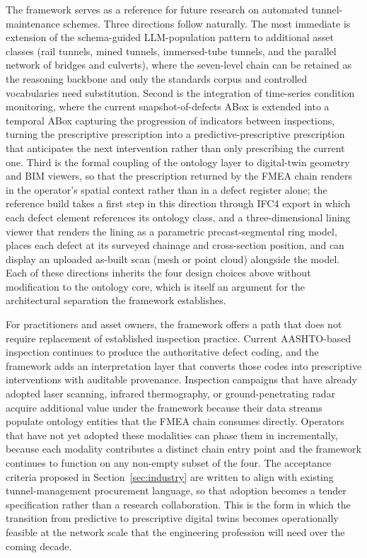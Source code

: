 \documentclass[11pt,a4paper]{article}
\begin{document}
The framework serves as a reference for future research on automated tunnel-maintenance schemes. Three directions follow naturally. The most immediate is extension of the schema-guided LLM-population pattern to additional asset classes (rail tunnels, mined tunnels, immersed-tube tunnels, and the parallel network of bridges and culverts), where the seven-level chain can be retained as the reasoning backbone and only the standards corpus and controlled vocabularies need substitution. Second is the integration of time-series condition monitoring, where the current snapshot-of-defects ABox is extended into a temporal ABox capturing the progression of indicators between inspections, turning the prescriptive prescription into a predictive-prescriptive prescription that anticipates the next intervention rather than only prescribing the current one. Third is the formal coupling of the ontology layer to digital-twin geometry and BIM viewers, so that the prescription returned by the FMEA chain renders in the operator's spatial context rather than in a defect register alone; the reference build takes a first step in this direction through IFC4 export in which each defect element references its ontology class, and a three-dimensional lining viewer that renders the lining as a parametric precast-segmental ring model, places each defect at its surveyed chainage and cross-section position, and can display an uploaded as-built scan (mesh or point cloud) alongside the model. Each of these directions inherits the four design choices above without modification to the ontology core, which is itself an argument for the architectural separation the framework establishes.

For practitioners and asset owners, the framework offers a path that does not require replacement of established inspection practice. Current AASHTO-based inspection continues to produce the authoritative defect coding, and the framework adds an interpretation layer that converts those codes into prescriptive interventions with auditable provenance. Inspection campaigns that have already adopted laser scanning, infrared thermography, or ground-penetrating radar acquire additional value under the framework because their data streams populate ontology entities that the FMEA chain consumes directly. Operators that have not yet adopted these modalities can phase them in incrementally, because each modality contributes a distinct chain entry point and the framework continues to function on any non-empty subset of the four. The acceptance criteria proposed in Section~\ref{sec:industry} are written to align with existing tunnel-management procurement language, so that adoption becomes a tender specification rather than a research collaboration. This is the form in which the transition from predictive to prescriptive digital twins becomes operationally feasible at the network scale that the engineering profession will need over the coming decade.
\end{document}
